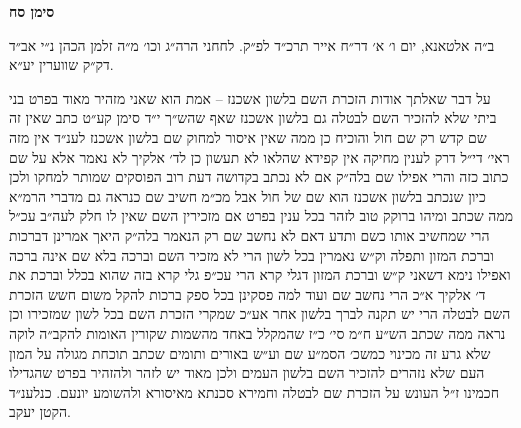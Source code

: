 \documentclass[12pt, openany]{book}
\newcommand{\chapname}{}
\newcommand{\newchap}[1]{
	\addcontentsline{toc}{chapter}{#1}
	\renewcommand{\chapname}{#1}
		\begin{center}
			\textbf{%
\fontsize{16pt}{16pt}\selectfont
				#1}
		\end{center}
}
\begin{document}
\newchap{סימן סח}
\begin{multicols}{2}
ב״ה אלטאנא, יום ו׳ א׳ דר״ח אייר תרכ״ד לפ״ק. לחחני הרה״ג וכו׳ מ״ה זלמן הכהן נ״י אב״ד דק״ק שווערין יע״א.\\\vspace{0pt}

על דבר שאלתך אודות הזכרת השם בלשון אשכנז – אמת הוא שאני מזהיר מאוד בפרט בני ביתי שלא להזכיר השם לבטלה גם בלשון אשכנז שאף שהש״ך י״ד סימן קע״ט כתב שאין זה שם קדש רק שם חול והוכיח כן ממה שאין איסור למחוק שם בלשון אשכנז לענ״ד אין מזה ראי׳ די״ל דרק לענין מחיקה אין קפידא שהלאו לא תעשון כן לד׳ אלקיך לא נאמר אלא על שם כתוב כזה והרי אפילו שם בלה״ק אם לא נכתב בקדושה דעת רוב הפוסקים שמותר למחקו ולכן כיון שנכתב בלשון אשכנז הוא שם של חול אבל מכ״מ חשיב שם כנראה גם מדברי הרמ״א ממה שכתב ומיהו ברוקק טוב לזהר בכל ענין בפרט אם מזכירין השם שאין לו חלק לעה״ב עכ״ל הרי שמחשיב אותו כשם ותדע דאם לא נחשב שם רק הנאמר בלה״ק היאך אמרינן דברכות וברכת המזון ותפלה וק״ש נאמרין בכל לשון הרי לא מזכיר השם וברכה בלא שם אינה ברכה ואפילו נימא דשאני ק״ש וברכת המזון דגלי קרא הרי עכ״פ גלי קרא בזה שהוא בכלל וברכת את ד׳ אלקיך א״כ הרי נחשב שם ועוד למה פסקינן בכל ספק ברכות להקל משום חשש הזכרת השם לבטלה הרי יש תקנה לברך בלשון אחר אע״כ שמקרי הזכרת השם בכל לשון שמזכירו וכן נראה ממה שכתב הש״ע ח״מ סי׳ כ״ז שהמקלל באחד מהשמות שקורין האומות להקב״ה לוקה שלא גרע זה מכינוי כמשכ׳ הסמ״ע שם וע״ש באורים ותומים שכתב תוכחת מגולה על המון העם שלא נזהרים להזכיר השם בלשון העמים ולכן מאוד יש לזהר ולהזהיר בפרט שהגדילו חכמינו ז״ל העונש על הזכרת שם לבטלה וחמירא סכנתא מאיסורא ולהשומע יונעם. כנלענ״ד הקטן יעקב.\\\vspace{0pt}

\end{multicols}\newpage
\end{document}
